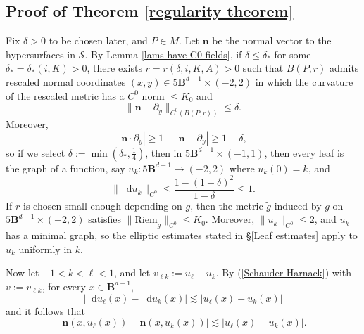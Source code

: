 \documentclass[reqno,11pt]{amsart}
\newcommand{\Ball}{\mathbf{B}}
\newcommand*\dif{\mathop{}\!\mathrm{d}}
\newcommand{\normal}{\mathbf n}
\newcommand{\Riem}{\mathrm{Riem}}
\theoremstyle{definition}
\numberwithin{equation}{section}
\begin{document}
\subsection{Proof of Theorem \ref{regularity theorem}}
Fix $\delta > 0$ to be chosen later, and $P \in M$.
Let $\normal$ be the normal vector to the hypersurfaces in $\mathcal S$.
By Lemma \ref{lams have C0 fields}, if $\delta \leq \delta_*$ for some $\delta_* = \delta_*(i, K) > 0$, there exists $r = r(\delta, i, K, A) > 0$ such that $B(P, r)$ admits rescaled normal coordinates $(x, y) \in 5\Ball^{d - 1} \times (-2, 2)$ in which the curvature of the rescaled metric has a $C^0$ norm $\leq K_0$ and
\begin{equation}\label{normal is almost constant}
\|\normal - \partial_y\|_{C^0(B(P, r))} \leq \delta.
\end{equation}
Moreover,
$$|\normal \cdot \partial_y| \geq 1 - |\normal - \partial_y| \geq 1 - \delta,$$
so if we select $\delta := \min(\delta_*, \frac{1}{4})$, then in $5\Ball^{d - 1} \times (-1, 1)$, then every leaf is the graph of a function, say $u_k: 5\Ball^{d - 1} \to (-2, 2)$ where $u_k(0) = k$, and
$$\|\dif u_k\|_{C^0} \leq \frac{1 - (1 - \delta)^2}{1 - \delta} \leq 1.$$
If $r$ is chosen small enough depending on $g$, then the metric $\tilde g$ induced by $g$ on $5\Ball^{d - 1} \times (-2, 2)$ satisfies $\|\Riem_{\tilde g}\|_{C^0} \leq K_0$.
Moreover, $\|u_k\|_{C^0} \leq 2$, and $u_k$ has a minimal graph, so the elliptic estimates stated in \S\ref{Leaf estimates} apply to $u_k$ uniformly in $k$.

Now let $-1 < k < \ell < 1$, and let $v_{\ell k} := u_\ell - u_k$.
By (\ref{Schauder Harnack}) with $v := v_{\ell k}$, for every $x \in \Ball^{d - 1}$,
\begin{equation}\label{bound on du}
|\dif u_\ell(x) - \dif u_k(x)| \lesssim |u_\ell(x) - u_k(x)|
\end{equation}
and it follows that
\begin{equation}\label{vertical Lipschitz}
|\normal(x, u_\ell(x)) - \normal(x, u_k(x))| \lesssim |u_\ell(x) - u_k(x)|.
\end{equation}
\end{document}
